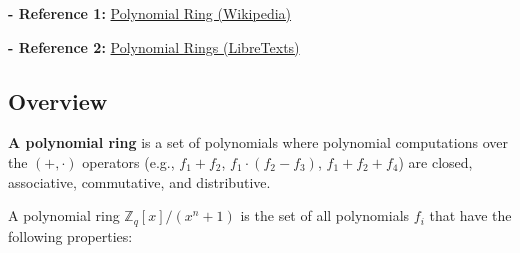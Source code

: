\textbf{- Reference 1:} 
\href{https://en.wikipedia.org/wiki/Polynomial_ring}{Polynomial Ring (Wikipedia)}~\cite{polynomial-ring}

\noindent \textbf{- Reference 2:} 
\href{https://math.libretexts.org/Bookshelves/Combinatorics_and_Discrete_Mathematics/Applied_Discrete_Structures_(Doerr_and_Levasseur)/16%3A_An_Introduction_to_Rings_and_Fields/16.03%3A_Polynomial_Rings}{Polynomial Rings (LibreTexts)}~\cite{polynomial-rings}

\subsection{Overview}
\label{subsec:poly-ring-overview}

\textbf{A polynomial ring} is a set of polynomials where polynomial computations over the $(+, \cdot)$ operators (e.g., $f_1 + f_2$, $f_1 \cdot (f_2 - f_3)$, $f_1 + f_2 + f_4$) are closed, associative, commutative, and distributive. 


A polynomial ring ${\mathbb{Z}_q[x] / (x^n + 1)}$ is the set of all polynomials $f_i$ that have the following properties:


